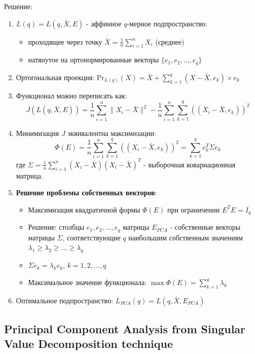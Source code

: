 \documentclass[a4paper,12pt]{article}
\begin{document}
Решение:
\begin{enumerate}
    \item $L(q) = L(q, \bar{X}, E)$ - аффинное $q$-мерное подпространство:
    \begin{itemize}
        \item проходящее через точку $\bar{X} = \frac{1}{n}\sum_{i=1}^n X_i$ (среднее)
        \item натянутое на ортонормированные векторы $\{e_1, e_2, \ldots, e_q\}$
    \end{itemize}

    \item Ортогональная проекция: $\text{Pr}_{L(q)}(X) = \bar{X} + \sum_{k=1}^q (X-\bar{X}, e_k) \times e_k$

    \item Функционал можно переписать как:
    $$J(L(q,\bar{X}, E)) = \frac{1}{n} \sum_{i=1}^n \|X_i-\bar{X}\|^2 - \frac{1}{n} \sum_{i=1}^n \sum_{k=1}^q ((X_i-\bar{X},e_k))^2$$

    \item Минимизация $J$ эквивалентна максимизации:
    $$\Phi(E) = \frac{1}{n} \sum_{i=1}^n \sum_{k=1}^q ((X_i-\bar{X},e_k))^2 = \sum_{k=1}^q e_k^T \Sigma e_k$$
    где $\Sigma = \frac{1}{n} \sum_{i=1}^n (X_i-\bar{X})(X_i-\bar{X})^T$ - выборочная ковариационная матрица.

    \item \textbf{Решение проблемы собственных векторов}:
    \begin{itemize}
        \item Максимизация квадратичной формы $\Phi(E)$ при ограничении $E^TE = I_q$
        \item Решение: столбцы $e_1, e_2, \ldots, e_q$ матрицы $E_{PCA}$ - собственные векторы матрицы $\Sigma$, соответствующие $q$ наибольшим собственным значениям $\lambda_1 \geq \lambda_2 \geq \ldots \geq \lambda_q$
        \item $\Sigma e_k = \lambda_k e_k$, $k = 1, 2, \ldots, q$
        \item Максимальное значение функционала: $\max \Phi(E) = \sum_{k=1}^q \lambda_k$
    \end{itemize}

    \item Оптимальное подпространство: $L_{PCA}(q) = L(q, \bar{X}, E_{PCA})$
\end{enumerate}

\subsection{Principal Component Analysis from Singular Value Decomposition technique}
\end{document}
